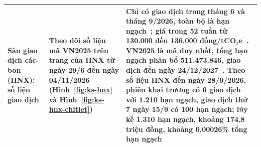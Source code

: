 \begin{table}[htbp]
\begin{tabularx}{\textwidth}{|>{\raggedright\arraybackslash}p{2.6cm}|>{\raggedright\arraybackslash}p{3.4cm}|X|}
        \hline
        Sàn giao dịch các-bon (HNX): số liệu giao dịch & Theo dõi số liệu mã VN2025 trên trang của HNX từ ngày 29/6 đến ngày 04/11/2026 (Hình~\ref{fig:ks-hnx} và Hình~\ref{fig:ks-hnx-chitiet}) & Chỉ có giao dịch trong tháng 6 và tháng 9/2026, toàn bộ là hạn ngạch~\cite{hnx2026sanphamcacbon}; giá trong 52 tuần từ 130.000 đến 136.000 đồng/tCO$_2$e~\cite{hnx2026ketquagd}. VN2025 là mã duy nhất, tổng hạn ngạch phân bổ 511.473.846, giao dịch đến ngày 24/12/2027~\cite{hnx2026danhmuchanngach}. Theo số liệu HNX đến ngày 28/9/2026, phiên khai trương có 6 giao dịch với 1.210 hạn ngạch, giao dịch thứ 7 ngày 15/9 có 100 hạn ngạch; lũy kế 1.310 hạn ngạch, khoảng 174,8 triệu đồng, khoảng 0,00026\% tổng hạn ngạch~\cite{dantri2026san3thang} \\
        \hline
    \end{tabularx}
\end{table}

